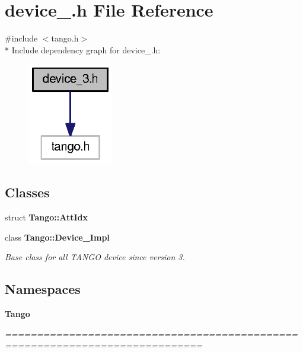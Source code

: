 \section{device\-\_.\-h File Reference}
\label{device__3_8h}
{\ttfamily \#include $<$tango.\-h$>$}\\*
Include dependency graph for device\-\_.\-h\-:
\nopagebreak
\begin{figure}[H]
\begin{center}
\leavevmode
\includegraphics[width=106pt]{df/d64/device__3_8h__incl}
\end{center}
\end{figure}
\subsection*{Classes}
\begin{DoxyCompactItemize}
\item 
struct {\bf Tango\-::\-Att\-Idx}
\item 
class {\bf Tango\-::\-Device\-\_\-Impl}
\begin{DoxyCompactList}\small\item\em Base class for all T\-A\-N\-G\-O device since version 3. \end{DoxyCompactList}\end{DoxyCompactItemize}
\subsection*{Namespaces}
\begin{DoxyCompactItemize}
\item 
{\bf Tango}
\begin{DoxyCompactList}\small\item\em ============================================================================= \end{DoxyCompactList}\end{DoxyCompactItemize}
